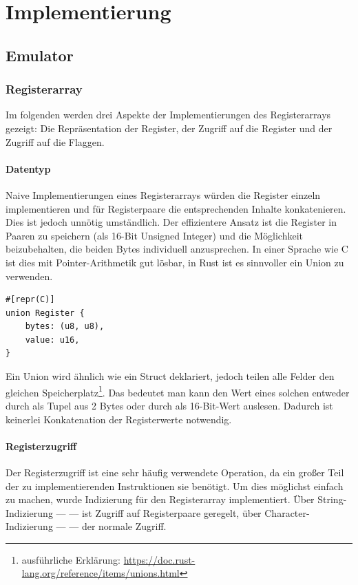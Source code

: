 \chapter{Implementierung}\label{chap:impl}

\section{Emulator}

\subsection{Registerarray}

Im folgenden werden drei Aspekte der Implementierungen des Registerarrays gezeigt: Die Repräsentation der Register, der Zugriff auf die Register und der Zugriff auf die Flaggen.

\subsubsection{Datentyp}

Naive Implementierungen eines Registerarrays würden die Register einzeln implementieren und für Registerpaare die entsprechenden Inhalte konkatenieren.
Dies ist jedoch unnötig umständlich. Der effizientere Ansatz ist die Register in Paaren zu speichern (als 16-Bit Unsigned Integer) und die Möglichkeit beizubehalten, die beiden Bytes individuell anzusprechen. In einer Sprache wie C ist dies mit Pointer-Arithmetik gut lösbar, in Rust ist es sinnvoller ein Union zu verwenden.

\begin{verbatim}
#[repr(C)]
union Register {
    bytes: (u8, u8),
    value: u16,
}
\end{verbatim}

Ein Union wird ähnlich wie ein Struct deklariert, jedoch teilen alle Felder den gleichen Speicherplatz\footnote{ausführliche Erklärung: \url{https://doc.rust-lang.org/reference/items/unions.html}}. Das bedeutet man kann den Wert eines solchen  entweder durch  als Tupel aus 2 Bytes oder durch  als 16-Bit-Wert auslesen. Dadurch ist keinerlei Konkatenation der Registerwerte notwendig.

\subsubsection{Registerzugriff}

Der Registerzugriff ist eine sehr häufig verwendete Operation, da ein großer Teil der zu implementierenden Instruktionen sie benötigt. Um dies möglichst einfach zu machen, wurde Indizierung für den Registerarray implementiert. Über String-Indizierung ---  --- ist Zugriff auf Registerpaare geregelt, über Character-Indizierung ---  --- der normale Zugriff.

